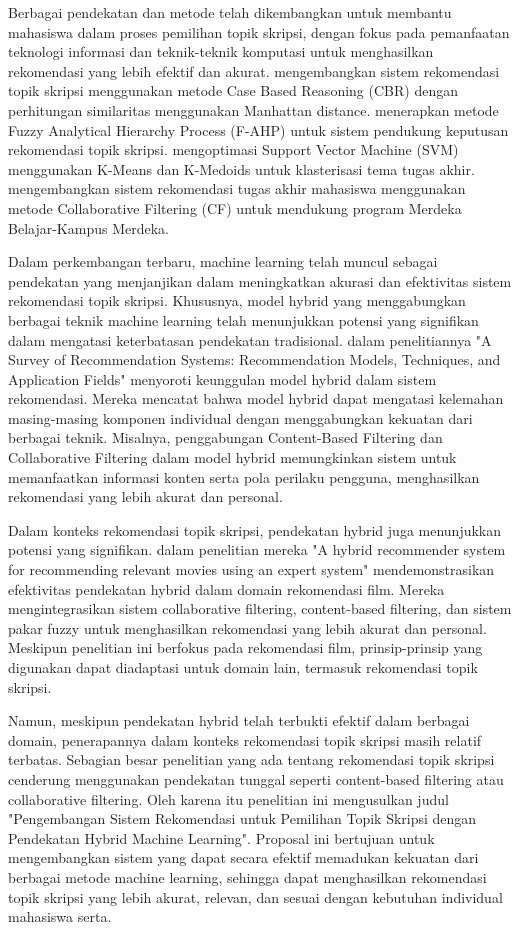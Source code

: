 Berbagai pendekatan dan metode telah dikembangkan untuk membantu mahasiswa dalam proses pemilihan topik skripsi, dengan fokus pada pemanfaatan teknologi informasi dan teknik-teknik komputasi untuk menghasilkan rekomendasi yang lebih efektif dan akurat.\cite{merawati2018sistem} mengembangkan sistem rekomendasi topik skripsi menggunakan metode Case Based Reasoning (CBR) dengan perhitungan similaritas menggunakan Manhattan distance. \cite{abdullah2021sistem} menerapkan metode Fuzzy Analytical Hierarchy Process (F-AHP) untuk sistem pendukung keputusan rekomendasi topik skripsi. \cite{patria2022optimasi} mengoptimasi Support Vector Machine (SVM) menggunakan K-Means dan K-Medoids untuk klasterisasi tema tugas akhir. \cite{salam2022sistem} mengembangkan sistem rekomendasi tugas akhir mahasiswa menggunakan metode Collaborative Filtering (CF) untuk mendukung program Merdeka Belajar-Kampus Merdeka.

Dalam perkembangan terbaru, machine learning telah muncul sebagai pendekatan yang menjanjikan dalam meningkatkan akurasi dan efektivitas sistem rekomendasi topik skripsi. Khususnya, model hybrid yang menggabungkan berbagai teknik machine learning telah menunjukkan potensi yang signifikan dalam mengatasi keterbatasan pendekatan tradisional. \cite{Ko2022} dalam penelitiannya "A Survey of Recommendation Systems: Recommendation Models, Techniques, and Application Fields" menyoroti keunggulan model hybrid dalam sistem rekomendasi. Mereka mencatat bahwa model hybrid dapat mengatasi kelemahan masing-masing komponen individual dengan menggabungkan kekuatan dari berbagai teknik. Misalnya, penggabungan Content-Based Filtering dan Collaborative Filtering dalam model hybrid memungkinkan sistem untuk memanfaatkan informasi konten serta pola perilaku pengguna, menghasilkan rekomendasi yang lebih akurat dan personal.

Dalam konteks rekomendasi topik skripsi, pendekatan hybrid juga menunjukkan potensi yang signifikan. \cite{walek2020hybrid} dalam penelitian mereka "A hybrid recommender system for recommending relevant movies using an expert system" mendemonstrasikan efektivitas pendekatan hybrid dalam domain rekomendasi film. Mereka mengintegrasikan sistem collaborative filtering, content-based filtering, dan sistem pakar fuzzy untuk menghasilkan rekomendasi yang lebih akurat dan personal. Meskipun penelitian ini berfokus pada rekomendasi film, prinsip-prinsip yang digunakan dapat diadaptasi untuk domain lain, termasuk rekomendasi topik skripsi.

Namun, meskipun pendekatan hybrid telah terbukti efektif dalam berbagai domain, penerapannya dalam konteks rekomendasi topik skripsi masih relatif terbatas. Sebagian besar penelitian yang ada tentang rekomendasi topik skripsi cenderung menggunakan pendekatan tunggal seperti content-based filtering atau collaborative filtering. Oleh karena itu penelitian ini mengusulkan judul "Pengembangan Sistem Rekomendasi  untuk Pemilihan Topik Skripsi dengan Pendekatan Hybrid Machine Learning".  Proposal ini bertujuan untuk mengembangkan sistem yang dapat secara efektif memadukan kekuatan dari berbagai metode machine learning, sehingga dapat menghasilkan rekomendasi topik skripsi yang lebih akurat, relevan, dan sesuai dengan kebutuhan individual mahasiswa serta. 

